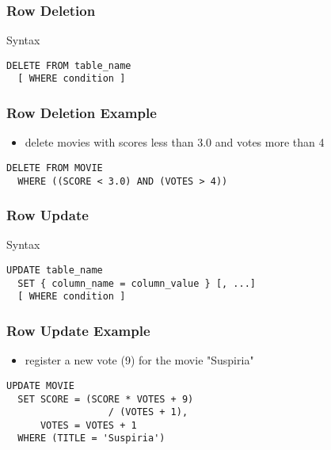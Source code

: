 \documentclass[dvipsnames]{beamer}
\theoremstyle{plain}
\begin{document}
\begin{frame}[fragile]
  \frametitle{Row Deletion}

  \begin{block}{Syntax}
    \begin{lstlisting}
DELETE FROM table_name
  [ WHERE condition ]
    \end{lstlisting}
  \end{block}
\end{frame}

\begin{frame}[fragile]
  \frametitle{Row Deletion Example}

  \begin{example}
    \begin{itemize}
      \item delete movies with scores less than 3.0 and votes more than 4
    \end{itemize}

    \begin{lstlisting}
DELETE FROM MOVIE
  WHERE ((SCORE < 3.0) AND (VOTES > 4))
    \end{lstlisting}
  \end{example}
\end{frame}

\begin{frame}[fragile]
  \frametitle{Row Update}

  \begin{block}{Syntax}
    \begin{lstlisting}
UPDATE table_name
  SET { column_name = column_value } [, ...]
  [ WHERE condition ]
    \end{lstlisting}
  \end{block}
\end{frame}

\begin{frame}[fragile]
  \frametitle{Row Update Example}

  \begin{example}
    \begin{itemize}
      \item register a new vote (9) for the movie "Suspiria"
    \end{itemize}

    \begin{lstlisting}
UPDATE MOVIE
  SET SCORE = (SCORE * VOTES + 9)
                  / (VOTES + 1),
      VOTES = VOTES + 1
  WHERE (TITLE = 'Suspiria')
    \end{lstlisting}
  \end{example}
\end{frame}
\end{document}
